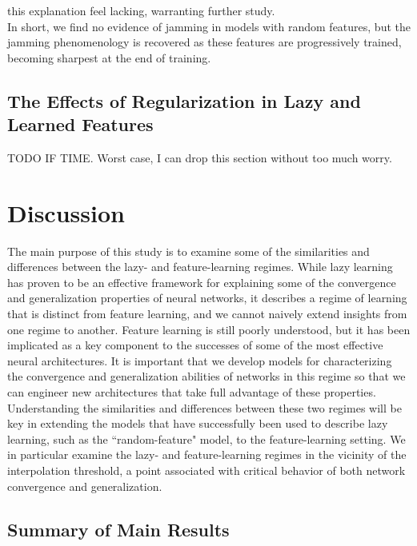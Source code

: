 \documentclass[11pt]{article}
\begin{document}
this explanation feel lacking, warranting further study.\\

In short, we find no evidence of jamming in models with random features, but the jamming phenomenology is recovered as these features are progressively trained, becoming sharpest at the end of training.\\ 

\subsection{The Effects of Regularization in Lazy and Learned Features}
\label{regularization}
TODO IF TIME. Worst case, I can drop this section without too much worry.\\

\section{Discussion}
\label{Discussion}

The main purpose of this study is to examine some of the similarities and differences between the lazy- and feature-learning regimes. While lazy learning has proven to be an effective framework for explaining some of the convergence and generalization properties of neural networks, it describes a regime of learning that is distinct from feature learning, and we cannot naively extend insights from one regime to another. Feature learning is still poorly understood, but it has been implicated as a key component to the successes of some of the most effective neural architectures. It is important that we develop models for characterizing the convergence and generalization abilities of networks in this regime so that we can engineer new architectures that take full advantage of these properties. Understanding the similarities and differences between these two regimes will be key in extending the models that have successfully been used to describe lazy learning, such as the ``random-feature" model, to the feature-learning setting. We in particular examine the lazy- and feature-learning regimes in the vicinity of the interpolation threshold, a point associated with critical behavior of both network convergence and generalization.\\

\subsection{Summary of Main Results} 
\end{document}
